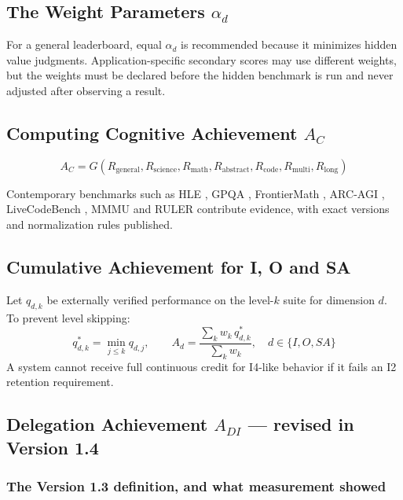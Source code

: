 \documentclass[11pt]{article}
\theoremstyle{definition}
\begin{document}
\subsection{The Weight Parameters $\alpha_d$}

\sloppy For a general leaderboard, equal $\alpha_d$ is recommended because it minimizes hidden value judgments. Application-specific secondary scores may use different weights, but the weights must be declared before the hidden benchmark is run and never adjusted after observing a result.

\subsection{Computing Cognitive Achievement $A_C$}

\begin{equation}
A_C = G(R_{\text{general}}, R_{\text{science}}, R_{\text{math}}, R_{\text{abstract}}, R_{\text{code}}, R_{\text{multi}}, R_{\text{long}})
\end{equation}

Contemporary benchmarks such as HLE \citep{phan2025hle}, GPQA \citep{rein2023gpqa}, FrontierMath \citep{glazer2024frontiermath}, ARC-AGI \citep{arc2026}, LiveCodeBench \citep{jain2024livecodebench}, MMMU \citep{yue2023mmmu} and RULER \citep{hsieh2024ruler} contribute evidence, with exact versions and normalization rules published.

\subsection{Cumulative Achievement for I, O and SA}

Let $q_{d,k}$ be externally verified performance on the level-$k$ suite for dimension $d$. To prevent level skipping:
\begin{equation}
q^{*}_{d,k} = \min_{j \le k} q_{d,j}, \qquad
A_d = \frac{\sum_k w_k\, q^{*}_{d,k}}{\sum_k w_k}, \quad d \in \{I,O,SA\}
\end{equation}
A system cannot receive full continuous credit for I4-like behavior if it fails an I2 retention requirement.

\subsection{Delegation Achievement $A_{DI}$ --- revised in Version 1.4}\label{sec:adi}

\subsubsection{The Version 1.3 definition, and what measurement showed}
\end{document}
